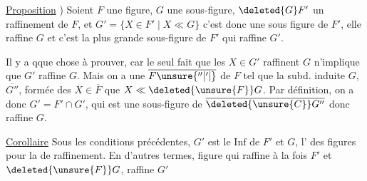  \uline{Proposition} ) Soient $F$ une figure, $G$ une sous-figure, $\deleted{G}F'$ un raffinement de $F$, et $G'=\{X\in F'\mid X\ll G\}$ c'est donc une sous figure de $F'$,  elle raffine $G$ et c'est  la plus grande sous-figure de $F'$ qui raffine $G'$.



 Il y a qque chose à prouver, car le seul fait que les $X\in G'$ raffinent $G$ n'implique  que $G'$ raffine $G$. Mais on a une   $\overline{F\unsure{''|'|{}}}$ de $F$ tel que   la subd. induite  $G$, $\overline{G''}$, formée des $X\in\overline{F}$  que $X\ll \deleted{\unsure{F}}G$.  Par définition, on a donc $G'=F'\cap G'$, qui est  une sous-figure de $\overline{\deleted{\unsure{C}}G''}$ donc raffine $G$.


\uline{Corollaire} Sous les conditions précédentes, $G'$ est le $\mathrm{Inf}$ de $F'$ et $G$,  l' des figures pour la   de raffinement. En d'autres termes,  figure  qui raffine à la fois $F'$ et $\deleted{\unsure{F}}G$, raffine $G'$

